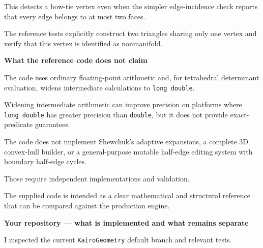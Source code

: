 This detects a bow-tie vertex even when the simpler edge-incidence check reports that every edge belongs to at most two faces.

The reference tests explicitly construct two triangles sharing only one vertex and verify that this vertex is identified as nonmanifold.

\textbf{What the reference code does not claim}

The code uses ordinary floating-point arithmetic and, for tetrahedral determinant evaluation, widens intermediate calculations to \texttt{long\ double}.

Widening intermediate arithmetic can improve precision on platforms where \texttt{long\ double} has greater precision than \texttt{double}, but it does not provide exact-predicate guarantees.

The code does not implement Shewchuk's adaptive expansions, a complete 3D convex-hull builder, or a general-purpose mutable half-edge editing system with boundary half-edge cycles.

Those require independent implementations and validation.

The supplied code is intended as a clear mathematical and structural reference that can be compared against the production engine.

\textbf{Your repository --- what is implemented and what remains separate}

I inspected the current \texttt{KairoGeometry} default branch and relevant tests.


